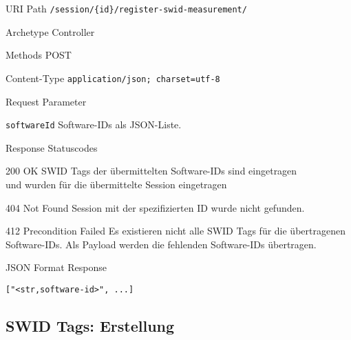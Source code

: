 \documentclass[10pt,a4paper]{scrartcl}
\begin{document}
\begin{mdframed}[style=def]
\begin{description*}
	\item[URI Path] \texttt{/session/\{id\}/register-swid-measurement/}
	\item[Archetype] Controller
	\item[Methods] POST
	\item[Content-Type] \texttt{application/json; charset=utf-8}
	\item[Request Parameter] \hfill
	\begin{description*}
		\item[\texttt{softwareId}] Software-IDs als JSON-Liste.
	\end{description*}
	\item[Response Statuscodes] \hfill
		\begin{description*}
			\item[200 OK] SWID Tags der übermittelten Software-IDs sind eingetragen \\
				und wurden für die übermittelte Session eingetragen
			\item[404 Not Found] Session mit der spezifizierten ID wurde nicht gefunden. 
			\item[412 Precondition Failed] Es existieren nicht alle SWID Tags für die
				übertragenen Software-IDs. Als Payload werden die fehlenden Software-IDs
				übertragen.
		\end{description*}
	\item[JSON Format Response] \hfill
\begin{lstlisting}
["<str,software-id>", ...]
\end{lstlisting}
\end{description*}
\end{mdframed}


\subsection{SWID Tags: Erstellung}
\label{api:create}
\end{document}
